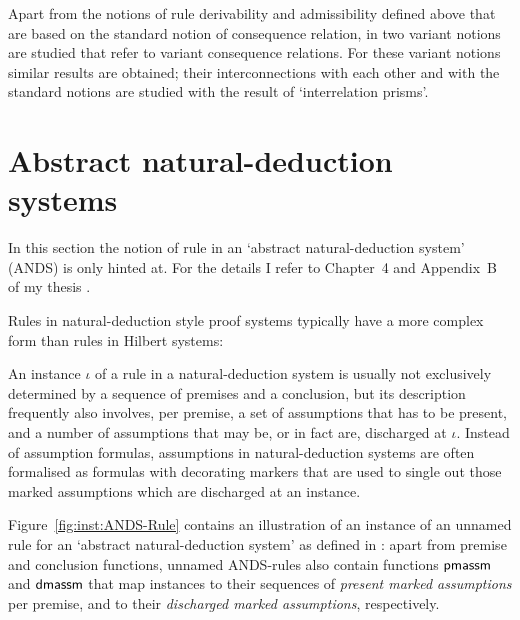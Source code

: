 \documentclass[envcountsame,runningheads]{llncs}
\newcommand{\funap}[2]{#1(#2)}
\newcommand{\ANDS}{ANDS}
\newcommand{\ainst}{\iota}
\newcommand{\sarity}{{\sf arity}}
\newcommand{\arity}{\funap{\sarity}}
\newcommand{\sdmassm}{{\sf dmassm}}
\newcommand{\spmassm}{{\sf pmassm}}
\begin{document}
Apart from the notions of rule derivability and admissibility
defined above that
are based on the standard notion of consequence relation, 
in \cite{grab:2003} two variant notions are studied that refer to
variant consequence relations.
For these variant notions similar results are obtained;
their interconnections with each other and with the standard notions
are studied with the result of `interrelation prisms'.  



\section{Abstract natural-deduction systems}
  \label{sec:ANDSs}


In this section the notion of rule in an `abstract natural-deduction system'
(\ANDS) is only hinted at. For the details I refer to Chapter~4 and Appendix~B
of my thesis \cite{grab:2005}. 

Rules in natural-deduction style proof systems typically have a more
complex form than rules in Hilbert systems:
\begin{Figure}[t]
\begin{center}
\scalebox{0.55}{}
\end{center}
\caption{\label{fig:inst:ANDS-Rule}Visualisation as an hypergraph hyperedge of
           an instance $\ainst$ with arity $\arity{\ainst} = n$ 
           of an \ANDS-rule.}
\end{Figure}
An instance $\ainst$ of a rule in a natural-deduction system 
is usually not exclusively determined by
a sequence of premises and a conclusion, but its description
frequently also involves, per premise,
a set of assumptions that has to be present, and a number of
assumptions that may be, or in fact are, discharged at $\ainst$.
Instead of assumption formulas, assumptions in natural-deduction systems
are often formalised as formulas with decorating markers 
that are used to single out those marked assumptions which are discharged 
at an instance.

Figure~\ref{fig:inst:ANDS-Rule} contains an illustration of
an instance of an unnamed rule for an `abstract natural-deduction system'
as defined in \cite{grab:2005}:
apart from premise and conclusion functions, unnamed \ANDS-rules
also contain functions $\spmassm$ and $\sdmassm$ that map instances
to their sequences of \emph{present marked assumptions} per premise,
and to their \emph{discharged marked assumptions}, respectively.
\end{document}
